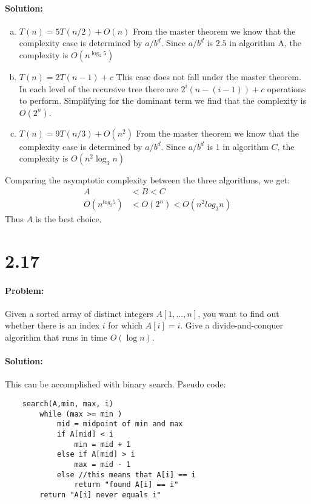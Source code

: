 \documentclass[12pt]{article}
\newcommand{\BigO}[1]{\ensuremath{O(#1)}}
\begin{document}
\paragraph{Solution:}
\begin{enumerate}[(a)]
\item $T(n) = 5T(n/2) + \BigO{n}$
    From the master theorem we know that the complexity case is determined
    by $a/b^{d}$.  Since $a/b^{d}$ is $2.5$ in algorithm A, the complexity
    is $\BigO{n^{\log_2 5}}$

\item $T(n) = 2T(n-1) + c$
    This case does not fall under the master theorem.  In each level of
    the	recursive tree there are $2^{i}(n-(i-1)) +c$ operations to perform.
    Simplifying for the dominant term we find that the complexity is
    $\BigO{2^{n}}$.

\item $T(n) = 9T(n/3) + \BigO{n^2}$
    From the master theorem we know that the complexity case is determined
    by $a/b^{d}$.  Since $a/b^{d}$ is $1$ in algorithm $C$, the complexity is
    $\BigO{n^{2}\log_3 n}$
\end{enumerate}

Comparing the asymptotic complexity between the three algorithms, we
get:
\begin{align*} 
A &< B < C \\
\BigO{n^{log_2 5}} &< \BigO{2^{n}} < \BigO{n^{2}log_3 n}
\end{align*}
Thus $A$ is the best choice.

\section*{2.17}
\paragraph{Problem:}

Given a sorted array of distinct integers $A[1, \dots , n]$, you want to
find out whether there is an index $i$ for which $A[i] = i$. Give a
divide-and-conquer algorithm that runs in time $\BigO{\log n}$.

\paragraph{Solution:}
This can be accomplished with binary search. Pseudo code:
\begin{verbatim}
    search(A,min, max, i)
        while (max >= min )
            mid = midpoint of min and max
            if A[mid] < i
                min = mid + 1
            else if A[mid] > i
                max = mid - 1
            else //this means that A[i] == i
                return "found A[i] == i"
        return "A[i] never equals i"
\end{verbatim}
\end{document}
